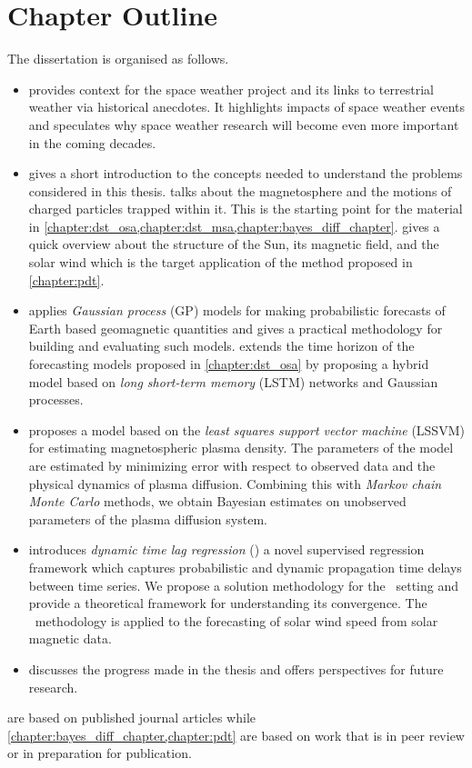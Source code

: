 \section{Chapter Outline}

The dissertation is organised as follows.

\begin{itemize}
    \item {} provides context for the space weather project and its 
    links to terrestrial weather via historical anecdotes. It highlights impacts of space weather 
    events and speculates why space weather research will become even more important in the coming 
    decades.

    \item {} gives a short introduction to the concepts needed 
    to understand the problems considered in this thesis.  talks about the 
    magnetosphere and the motions of charged particles trapped within it. This is the starting 
    point for the material in \cref{chapter:dst_osa,chapter:dst_msa,chapter:bayes_diff_chapter}. 
     gives a quick overview about the structure of the Sun, its magnetic field, 
    and the solar wind which is the target application of the method proposed in \cref{chapter:pdt}.
    
    \item {} applies \emph{Gaussian process} (GP) models for making 
    probabilistic forecasts of Earth based geomagnetic quantities and gives a practical methodology 
    for building and evaluating such models.  extends the time horizon of the 
    forecasting models proposed in \cref{chapter:dst_osa} by proposing a hybrid model based on 
    \emph{long short-term memory} (LSTM) networks and Gaussian processes.
    
    \item {} proposes a model based on the 
    \emph{least squares support vector machine} (LSSVM) for estimating magnetospheric plasma 
    density. The parameters of the model are estimated by minimizing error with respect to observed 
    data and the physical dynamics of plasma diffusion. Combining this with 
    \emph{Markov chain Monte Carlo} methods, we obtain Bayesian estimates on unobserved 
    parameters of the plasma diffusion system.   
    
    \item {} introduces \emph{dynamic time lag regression} (\XX) a novel 
    supervised regression framework which captures probabilistic and dynamic propagation time 
    delays between time series. We propose a solution methodology for the \XX \ setting and provide 
    a theoretical framework for understanding its convergence. The \XX \ methodology is applied to 
    the forecasting of solar wind speed from solar magnetic data. 
    
    \item {} discusses the progress made in the thesis and offers 
    perspectives for future research.
\end{itemize}


 are based on published journal articles 
while \cref{chapter:bayes_diff_chapter,chapter:pdt} are based on work that is in peer review or in 
preparation for publication.  